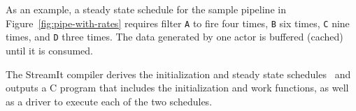 As an example, a steady state schedule for the sample pipeline in
Figure~\ref{fig:pipe-with-rates} requires filter \texttt{A} to fire
four times, \texttt{B} six times, \texttt{C} nine times, and
\texttt{D} three times. 
The data generated by one actor is buffered (cached) until it is
consumed.

The StreamIt compiler derives the initialization and steady state
schedules~\cite{karczma-lctes03} and outputs a C program that includes
the initialization and work functions, as well as a driver to execute
each of the two schedules. 



